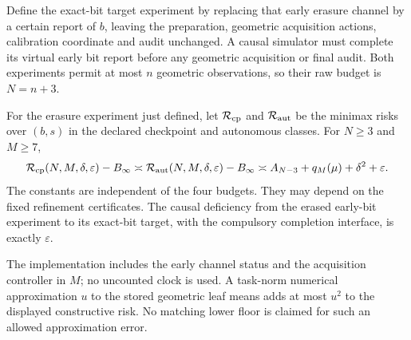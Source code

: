 Define the exact-bit target experiment by replacing that early erasure channel by a certain report of $b$, leaving the preparation, geometric acquisition actions, calibration coordinate and audit unchanged. A causal simulator must complete its virtual early bit report before any geometric acquisition or final audit. Both experiments permit at most $n$ geometric observations, so their raw budget is $N=n+3$.

\begin{corollary}\label{cor:adaptivejoint}
For the erasure experiment just defined, let $\mathcal R_{\rm cp}$ and $\mathcal R_{\rm aut}$ be the minimax risks over $(b,s)$ in the declared checkpoint and autonomous classes. For $N\ge3$ and $M\ge7$,
\begin{equation}\label{eq:adaptivejointlaw}
 \mathcal R_{\rm cp}(N,M,\delta,\varepsilon)-B_\infty
 \asymp\mathcal R_{\rm aut}(N,M,\delta,\varepsilon)-B_\infty
 \asymp A_{N-3}+q_M(\mu)+\delta^2+\varepsilon.
\end{equation}
The constants are independent of the four budgets. They may depend on the fixed refinement certificates. The causal deficiency from the erased early-bit experiment to its exact-bit target, with the compulsory completion interface, is exactly $\varepsilon$.

The implementation includes the early channel status and the acquisition controller in $M$; no uncounted clock is used. A task-norm numerical approximation $u$ to the stored geometric leaf means adds at most $u^2$ to the displayed constructive risk. No matching lower floor is claimed for such an allowed approximation error.
\end{corollary}
